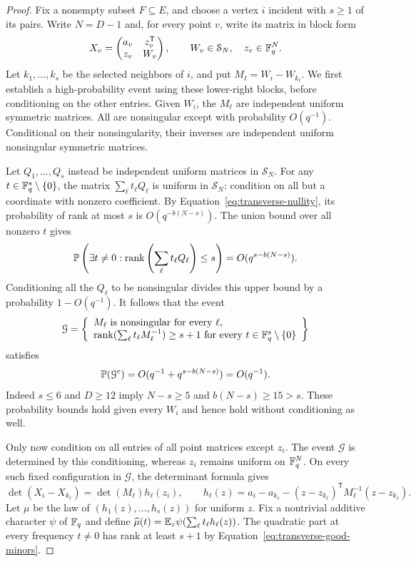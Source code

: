 \begin{proof}
Fix a nonempty subset $F\subseteq E$, and choose a vertex $i$ incident
with $s\geq1$ of its pairs. Write $N=D-1$ and, for every point $v$,
write its matrix in block form
\[
 X_v=\begin{pmatrix}a_v&z_v^{\mathsf T}\\z_v&W_v\end{pmatrix},
 \qquad W_v\in\mathcal S_N,\quad z_v\in\F_q^N.
\]
Let $k_1,\ldots,k_s$ be the selected neighbors of $i$, and put
$M_\ell=W_i-W_{k_\ell}$. We first establish a high-probability event
using these lower-right blocks, before conditioning on the other
entries. Given $W_i$, the $M_\ell$ are independent uniform symmetric
matrices. All are nonsingular except with probability $O(q^{-1})$.
Conditional on their nonsingularity, their inverses are independent
uniform nonsingular symmetric matrices.

Let $Q_1,\ldots,Q_s$ instead be independent uniform matrices in
$\mathcal S_N$. For any $t\in\F_q^s\setminus\{0\}$, the matrix
$\sum_\ell t_\ell Q_\ell$ is uniform in $\mathcal S_N$: condition on
all but a coordinate with nonzero coefficient. By
Equation~\eqref{eq:transverse-nullity}, its probability of rank at most
$s$ is $O(q^{-b(N-s)})$. The union bound over all nonzero $t$ gives
\[
 \P\left(\exists t\ne0:
       \rank\left(\sum_\ell t_\ell Q_\ell\right)\leq s\right)
 =O(q^{s-b(N-s)}).
\]
Conditioning all the $Q_\ell$ to be nonsingular divides this upper bound
by a probability $1-O(q^{-1})$. It follows that the event
\begin{equation}
\label{eq:transverse-good-minors}
 \mathcal G=\left\{\begin{array}{l}
 M_\ell\text{ is nonsingular for every }\ell,\\
 \rank(\sum_\ell t_\ell M_\ell^{-1})\geq s+1
       \text{ for every }t\in\F_q^s\setminus\{0\}
 \end{array}\right\}
\end{equation}
satisfies
\begin{equation}
\label{eq:transverse-good-probability}
 \P(\mathcal G^c)=O(q^{-1}+q^{s-b(N-s)})=O(q^{-1}).
\end{equation}
Indeed $s\leq6$ and $D\geq12$ imply $N-s\geq5$ and
$b(N-s)\geq15>s$. These probability bounds hold given every $W_i$
and hence hold without conditioning as well.

Only now condition on all entries of all point matrices except $z_i$.
The event $\mathcal G$ is determined by this conditioning, whereas
$z_i$ remains uniform on $\F_q^N$. On every such fixed configuration
in $\mathcal G$, the determinant formula gives
\begin{equation}
\label{eq:transverse-schur-evaluations}
 \det(X_i-X_{k_\ell})=\det(M_\ell)h_\ell(z_i),\qquad
 h_\ell(z)=a_i-a_{k_\ell}
 -(z-z_{k_\ell})^{\mathsf T}M_\ell^{-1}(z-z_{k_\ell}).
\end{equation}
Let $\mu$ be the law of $(h_1(z),\ldots,h_s(z))$ for uniform $z$.
Fix a nontrivial additive character $\psi$ of $\F_q$ and define
$\widehat\mu(t)=\E_z\psi(\sum_\ell t_\ell h_\ell(z))$.
The quadratic part at every frequency $t\ne0$ has rank at least $s+1$
by Equation~\eqref{eq:transverse-good-minors}.


\end{proof}
